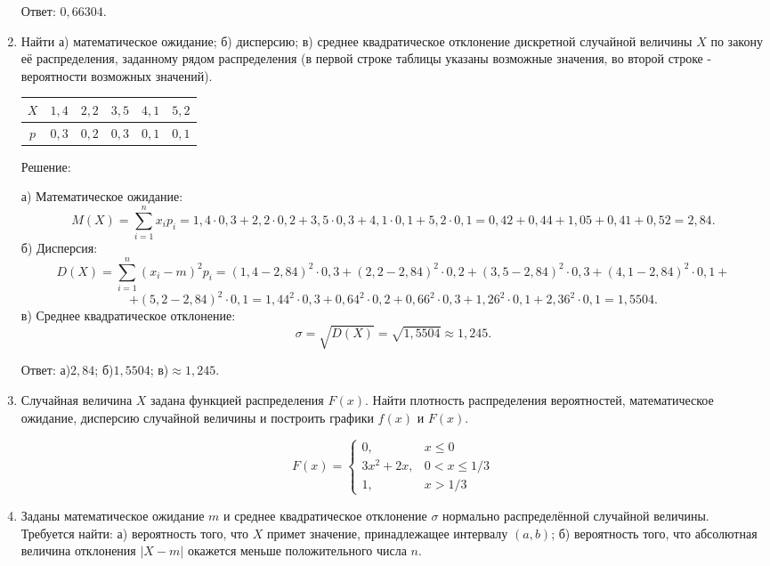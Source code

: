 \documentclass{article}
\renewcommand{\leq}{\ensuremath{\leqslant}}
\begin{document}
\begin{enumerate}
Ответ: $0,66304$.

\item %
Найти а) математическое ожидание; б) дисперсию; в) среднее квадратическое отклонение дискретной случайной величины $X$ по закону её распределения, заданному рядом распределения (в первой строке таблицы указаны возможные значения, во второй строке - вероятности возможных значений).

\begin{center}
\begin{tabular}{|c|c|c|c|c|c|}
\hline
$X$ & $1,4$ & $2,2$ & $3,5$ & $4,1$ & $5,2$ \\
\hline
$p$ & $0,3$ & $0,2$ & $0,3$ & $0,1$ & $0,1$ \\
\hline
\end{tabular}
\end{center}
\begin{center}Решение:\end{center}
а) Математическое ожидание: $$M(X)=\sum_{i=1}^n x_i p_i=1,4\cdot0,3+2,2\cdot0,2+3,5\cdot0,3+4,1\cdot0,1+5,2\cdot0,1=0,42+0,44+1,05+0,41+0,52=2,84.$$
б) Дисперсия:
$$D(X)=\sum_{i=1}^n (x_i-m)^2 p_i=(1,4-2,84)^2\cdot0,3+(2,2-2,84)^2\cdot0,2+(3,5-2,84)^2\cdot0,3+(4,1-2,84)^2\cdot0,1+$$
$$+(5,2-2,84)^2\cdot0,1=1,44^2\cdot0,3+0,64^2\cdot0,2+0,66^2\cdot0,3+1,26^2\cdot0,1+2,36^2\cdot0,1=1,5504.$$
в) Среднее квадратическое отклонение:
$$\sigma=\sqrt{D(X)}=\sqrt{1,5504}\approx1,245.$$

Ответ: а)$2,84$; б)$1,5504$; в)$\approx1,245$.

\item %
Случайная величина $X$ задана функцией распределения $F(x)$. Найти плотность распределения вероятностей, математическое ожидание, дисперсию случайной величины и построить графики $f(x)$ и $F(x)$.

\begin{equation*}
F(x) =
 \begin{cases}
  0, & x\leq0\\
  3x^2+2x, & 0<x\leq1/3\\
  1, & x>1/3
 \end{cases}
\end{equation*}

\item %
Заданы математическое ожидание $m$ и среднее квадратическое отклонение $\sigma$ нормально распределённой случайной величины. \newline
Требуется найти: а) вероятность того, что $X$ примет значение, принадлежащее интервалу $(a, b)$; \newline
б) вероятность того, что абсолютная величина отклонения $|X-m|$ окажется меньше положительного числа $n$.


\end{enumerate}
\end{document}
